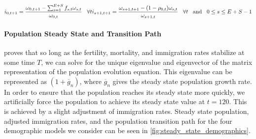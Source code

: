 \documentclass[10pt]{article}
\renewcommand{\thesection}{\arabic{section}}
\renewcommand{\thesubsection}{\thesection.\arabic{subsection}}
\renewcommand{\subsection}[2][]{\oldsubsection[#1]{#2}\index{#1}\label{sec:\thesubsection}}
\numberwithin{equation}{subsection}
\begin{document}
\begin{appendices}
\begin{dmath}
   {i_{0,t+1} = \frac{\omega_{0,t+1} - \sum_{s=1}^{E+S}f_{s,t}\omega_{s,t}}{\omega_{0,t}} \hspace{3mm} \forall t} \\
   {i_{s+1,t+1} = \frac{\omega_{s+1,t+1} - (1-\rho_{0,t})\omega_{s,t}}{\omega_{s+1,t}} \hspace{3mm} \forall t \hspace{3mm} \text{and} \hspace{3mm} 0 \leq s \leq E + S - 1}
\end{dmath}


\paragraph{Population Steady State and Transition Path}

\par \cite{E2020} proves that so long as the fertility, mortality, and immigration rates stabilize at some time \(T\), we can solve for the unique eigenvalue and eigenvector of the matrix representation of the population evolution equation. This eigenvalue can be represented as \((1 + \overline{g}_n)\), where \(\overline{g}_n\) gives the steady state population growth rate. In order to ensure that the population reaches its steady state more quickly, we artificially force the population to achieve its steady state value at \(t=120\). This is achieved by a slight adjustment of immigration rates. Steady state population, adjusted immigration rates, and the population transition path for the four demographic models we consider can be seen in \autoref{fig:steady_state_demographics}.


\newpage
\subsection{Model}


\end{appendices}
\end{document}
